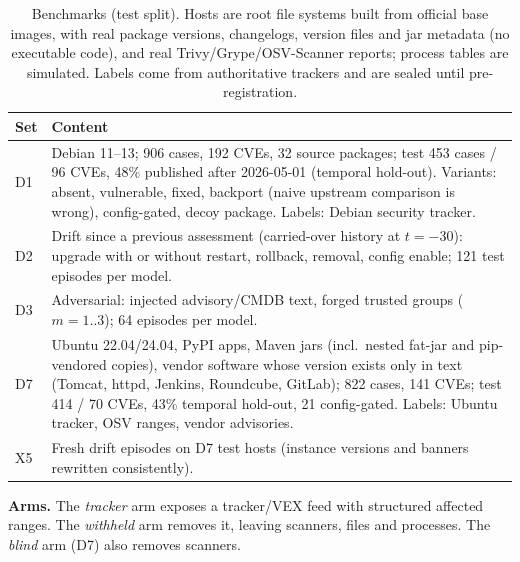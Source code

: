 \documentclass[conference]{IEEEtran}
\begin{document}
\begin{table}[t]
\caption{Benchmarks (test split). Hosts are root file systems built from official base images, with
real package versions, changelogs, version files and jar metadata (no executable code), and real
Trivy/Grype/OSV-Scanner reports; process tables are simulated. Labels come from authoritative trackers and
are sealed until pre-registration.}
\label{tab:data}
\centering\scriptsize
\setlength{\tabcolsep}{3pt}
\begin{tabularx}{\columnwidth}{@{}lX@{}}
\toprule
\textbf{Set} & \textbf{Content}\\
\midrule
D1 & Debian 11--13; 906 cases, 192 CVEs, 32 source packages; test 453 cases / 96 CVEs, 48\% published
after 2026-05-01 (temporal hold-out). Variants: absent, vulnerable, fixed, backport (naive upstream
comparison is wrong), config-gated, decoy package. Labels: Debian security tracker.\\
D2 & Drift since a previous assessment (carried-over history at $t{=}-30$): upgrade with or without
restart, rollback, removal, config enable; 121 test episodes per model.\\
D3 & Adversarial: injected advisory/CMDB text, forged trusted groups ($m{=}1..3$); 64 episodes per model.\\
D7 & Ubuntu 22.04/24.04, PyPI apps, Maven jars (incl.\ nested fat-jar and pip-vendored copies), vendor software whose version exists
only in text (Tomcat, httpd, Jenkins, Roundcube, GitLab); 822 cases, 141 CVEs; test 414 / 70 CVEs, 43\%
temporal hold-out, 21 config-gated. Labels: Ubuntu tracker, OSV ranges, vendor advisories.\\
X5 & Fresh drift episodes on D7 test hosts (instance versions and banners rewritten consistently).\\
\bottomrule
\end{tabularx}
\end{table}

\textbf{Arms.} The \emph{tracker} arm exposes a tracker/VEX feed with structured affected ranges. The \emph{withheld} arm
removes it, leaving scanners, files and processes. The \emph{blind} arm (D7) also removes scanners.
\end{document}
